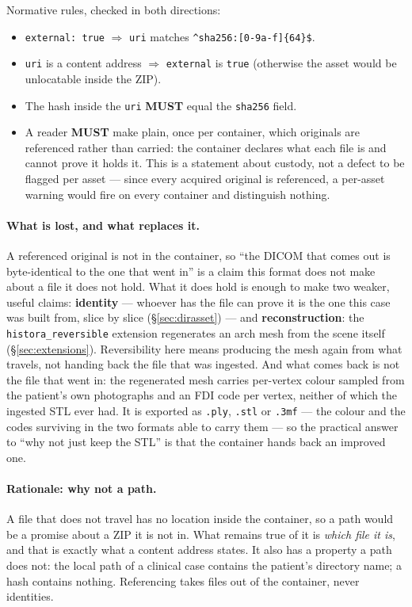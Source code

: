 \documentclass[11pt,a4paper]{article}
\newcommand{\MUST}{\textcolor{uosred}{\textbf{MUST}}}
\newcommand{\code}[1]{\texttt{\small #1}}
\begin{document}
Normative rules, checked in both directions:
\begin{itemize}
  \item \code{external: true} $\Rightarrow$ \code{uri} matches \code{\^{}sha256:[0-9a-f]\{64\}\$}.
  \item \code{uri} is a content address $\Rightarrow$ \code{external} is \code{true}
  (otherwise the asset would be unlocatable inside the ZIP).
  \item The hash inside the \code{uri} \MUST{} equal the \code{sha256} field.
  \item A reader \MUST{} make plain, once per container, which originals are referenced
  rather than carried: the container declares what each file is and cannot prove it holds
  it. This is a statement about custody, not a defect to be flagged per asset --- since
  every acquired original is referenced, a per-asset warning would fire on every container
  and distinguish nothing.
\end{itemize}

\paragraph{What is lost, and what replaces it.} A referenced original is not in the
container, so ``the DICOM that comes out is byte-identical to the one that went in'' is a
claim this format does not make about a file it does not hold. What it does hold is enough
to make two weaker, useful claims: \textbf{identity} --- whoever has the file can prove it
is the one this case was built from, slice by slice (\S\ref{sec:dirasset}) --- and
\textbf{reconstruction}: the \code{histora\_reversible} extension regenerates an arch mesh from
the scene itself (\S\ref{sec:extensions}). Reversibility here means producing the mesh
again from what travels, not handing back the file that was ingested. And what comes back is not the file that went in: the regenerated mesh carries per-vertex
colour sampled from the patient's own photographs and an FDI code per vertex, neither of
which the ingested STL ever had. It is exported as \code{.ply}, \code{.stl} or \code{.3mf}
--- the colour and the codes surviving in the two formats able to carry them --- so the
practical answer to ``why not just keep the STL'' is that the container hands back an
improved one.

\paragraph{Rationale: why not a path.} A file that does not travel has no location
inside the container, so a path would be a promise about a ZIP it is not in. What remains
true of it is \emph{which file it is}, and that is exactly what a content address states.
It also has a property a path does not: the local path of a clinical case contains the
patient's directory name; a hash contains nothing. Referencing takes files out of the
container, never identities.
\end{document}
